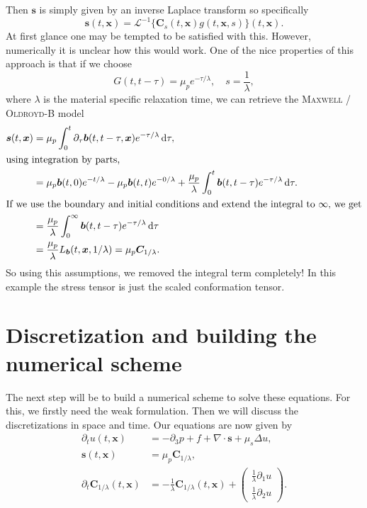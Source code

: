 \documentclass[12pt,a4paper,twoside, open=right]{scrreprt}
\theoremstyle{definition}
\theoremstyle{plain}
\newcommand{\bfb}{\bm{b}}
\newcommand{\bfs}{\bm{s}}
\newcommand{\bfC}{\bm{C}}
\newcommand{\bfx}{\bm{x}}
\newcommand{\D}{\mathop{}\!\mathrm{d}}
\begin{document}
Then $\bfs$ is simply given by an inverse Laplace transform so specifically
\begin{equation}
    \bfs(t,\bfx) =\mathcal{L}^{-1}\{\bfC_s(t,\bfx)g(t,\bfx,s)\}(t,\bfx).
\end{equation}
At first glance one may be tempted to be satisfied with this. However, numerically it is unclear how this would work. One of the nice properties of this approach is that if we choose 
\begin{equation}
    G(t,t-\tau)= \mu_p e^{-\tau/\lambda},\quad s=\frac{1}{\lambda},
\end{equation}
where $\lambda$ is the material specific relaxation time, we can retrieve the \textsc{Maxwell} / \textsc{Oldroyd}-B model 
\begin{align}
    \bfs(t,\bfx)&=\mu_p\int_0^t\partial_\tau\bfb(t,t-\tau,\bfx)e^{-\tau/\lambda}\D\tau,\\
    \intertext{using integration by parts,}
    &=\mu_p\bfb(t,0)e^{-t/\lambda}-\mu_p\bfb(t,t)e^{-0/\lambda}+\frac{\mu_p}{\lambda}\int_0^t\bfb(t,t-\tau)e^{-\tau/\lambda}\D\tau.\\
    \intertext{If we use the boundary and initial conditions and extend the integral to $\infty$, we get}
    &=\frac{\mu_p}{\lambda}\int_0^\infty\bfb(t,t-\tau)e^{-\tau/\lambda}\D\tau\\
    &=\frac{\mu_p}{\lambda}L_{\bfb}(t,\bfx,1/\lambda) = \mu_p\bfC_{1/\lambda}.
\end{align}
So using this assumptions, we removed the integral term completely! In this example the stress tensor is just the scaled conformation tensor. 
\chapter{Discretization and building the numerical scheme}
The next step will be to build a numerical scheme to solve these equations. For this, we firstly need the weak formulation. Then we will discuss the discretizations in space and time. Our equations are now given by 
\begin{align}
    \label{eq:transfeq1}
    \partial_t u(t,\bfx) &= -\partial_3 p + f +\nabla\cdot \bfs+\mu_s\Delta u,\\
    \label{eq:transfeq2}
    \bfs(t,\bfx)&=\mu_p\bfC_{1/\lambda},\\
    \partial_t\bfC_{1/\lambda}(t,\bfx) &= -\frac{1}{\lambda}\bfC_{1/\lambda}(t,\bfx)+\begin{pmatrix}
    \frac{1}{\lambda}\partial_1u\\\frac{1}{\lambda}\partial_2 u
    \end{pmatrix}.
    \label{eq:transfeq3}
\end{align}
\end{document}
